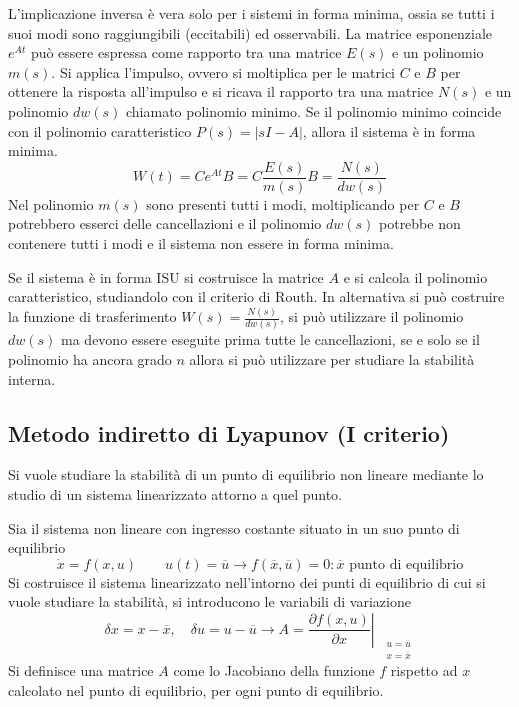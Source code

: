 L'implicazione inversa è vera solo per i sistemi in forma minima, ossia se
tutti i suoi modi sono raggiungibili (eccitabili) ed osservabili.
La matrice esponenziale $e^{At}$ può essere espressa come rapporto tra una
matrice $E(s)$ e un polinomio $m(s)$. Si applica l'impulso, ovvero si
moltiplica per le matrici $C$ e $B$ per ottenere la risposta all'impulso e si
ricava il rapporto tra una matrice $N(s)$ e un polinomio $dw(s)$ chiamato
polinomio minimo. Se il polinomio minimo coincide con il polinomio
caratteristico $P(s)=|sI-A|$, allora il sistema è in forma minima.
$$
W(t)  = Ce^{At}B = C\frac{E(s)}{m(s)}B = \frac{N(s)}{dw(s)}
$$
Nel polinomio $m(s)$ sono presenti tutti i modi, moltiplicando per $C$ e $B$
potrebbero esserci delle cancellazioni e il polinomio $dw(s)$ potrebbe non
contenere tutti i modi e il sistema non essere in forma minima.

Se il sistema è in forma ISU si costruisce la matrice $A$ e si calcola il
polinomio caratteristico, studiandolo con il criterio di Routh.
In alternativa si può costruire la funzione di trasferimento
$W(s)=\frac{N(s)}{dw(s)}$, si può utilizzare il polinomio $dw(s)$ ma devono
essere eseguite prima tutte le cancellazioni, se e solo se il polinomio ha
ancora grado $n$ allora si può utilizzare per studiare la stabilità interna.

\subsection{Metodo indiretto di Lyapunov (I criterio)}
Si vuole studiare la stabilità di un punto di equilibrio non lineare mediante
lo studio di un sistema linearizzato attorno a quel punto.

Sia il sistema non lineare con ingresso costante situato in un suo punto di
equilibrio
$$
\dot{x} =f(x,u) \qquad u(t) = \overline{u} \longrightarrow
f(\overline{x},\overline{u})=0 : \overline{x} \text{ punto di equilibrio}
$$
Si costruisce il sistema linearizzato nell'intorno dei punti di equilibrio di
cui si vuole studiare la stabilità, si introducono le variabili di variazione
$$
\delta x = x-\overline{x},\quad \delta u = u - \overline{u} \rightarrow
A=\left.\frac{\partial f(x,u)}{\partial x}\right|_{
\begin{aligned}
&u=\overline{u}\\
&x=\overline{x}
\end{aligned}}
$$
Si definisce una matrice $A$ come lo Jacobiano della funzione $f$ rispetto ad
$x$ calcolato nel punto di equilibrio, per ogni punto di equilibrio.

